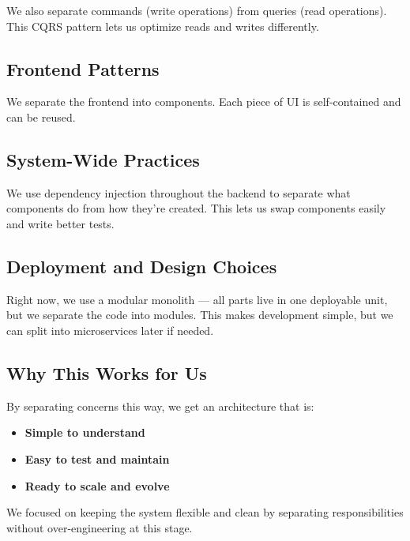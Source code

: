 We also separate commands (write operations) from queries (read operations). This CQRS pattern lets us optimize reads and writes differently.
\subsection{Frontend Patterns}
We separate the frontend into components. Each piece of UI is self-contained and can be reused.
\subsection{System-Wide Practices}
We use dependency injection throughout the backend to separate what components do from how they're created. This lets us swap components easily and write better tests.
\subsection{Deployment and Design Choices}
Right now, we use a modular monolith — all parts live in one deployable unit, but we separate the code into modules. This makes development simple, but we can split into microservices later if needed.
\subsection{Why This Works for Us}
By separating concerns this way, we get an architecture that is:
\begin{itemize}
    \item \textbf{Simple to understand}
    \item \textbf{Easy to test and maintain}
    \item \textbf{Ready to scale and evolve}
\end{itemize}
We focused on keeping the system flexible and clean by separating responsibilities without over-engineering at this stage.